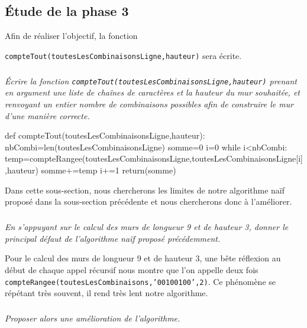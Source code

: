 \subsection*{\'Etude de la phase 3}
Afin de réaliser l'objectif, la fonction

\texttt{compteTout(toutesLesCombinaisonsLigne,hauteur)} sera écrite. 


\subparagraph{}\textit{\'Ecrire la fonction
 \texttt{compteTout(toutesLesCombinaisonsLigne,hauteur)} prenant en argument une liste de chaînes de caractères et la hauteur du mur souhaitée, et renvoyant un entier nombre de combinaisons possibles afin de construire le mur d'une manière correcte.}
\ifprof
\begin{corrige}
def compteTout(toutesLesCombinaisonsLigne,hauteur):
    nbCombi=len(toutesLesCombinaisonsLigne)
    somme=0
    i=0
    while i<nbCombi:
        temp=compteRangee(toutesLesCombinaisonsLigne,toutesLesCombinaisonsLigne[i],hauteur)
        somme+=temp
        i+=1
    return(somme)
\end{corrige}
\else
\fi

Dans cette sous-section, nous chercherons les limites de notre algorithme naïf proposé dans la sous-section précédente et nous chercherons donc à l'améliorer.

\subparagraph{}\textit{En s'appuyant sur le calcul des murs de longueur 9 et de hauteur 3, donner le principal défaut de l'algorithme naïf proposé précédemment.}


\ifprof
\begin{corrige}
Pour le calcul des murs de longueur 9 et de hauteur 3, une bête réflexion au début de chaque appel récursif nous montre que l'on appelle deux fois \texttt{compteRangee(toutesLesCombinaisons,'00100100',2)}. Ce phénomène se répétant très souvent, il rend très lent notre algorithme.
\end{corrige}
\else
\fi


\subparagraph{}\textit{Proposer alors une amélioration de l'algorithme.}



